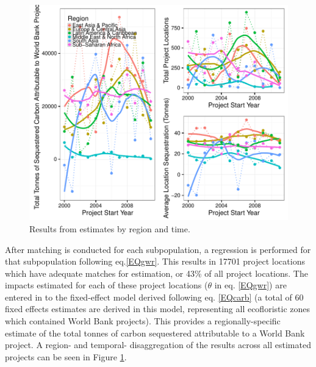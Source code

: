 \documentclass{article}\usepackage[]{graphicx}\usepackage[]{color}
\makeatletter
\def\maxwidth{ %
  \ifdim\Gin@nat@width>\linewidth
    \linewidth
  \else
    \Gin@nat@width
  \fi
}
\newenvironment{knitrout}{}{}  %
\makeatother
\begin{document}
\begin{knitrout}
\begin{figure}\centering
\begin{Schunk}

\includegraphics[width=\maxwidth]{figure/Fig1-1} \end{Schunk}
\caption{Results from estimates by region and time.}
\label{result_fig}
\vspace{10pt}
\end{figure}  

After matching is conducted for each subpopulation, a regression is performed for that subpopulation following eq.\ref{EQgwr}.  
This results in 17701 project locations which have adequate matches for estimation, or 43\% of all project locations. 
The impacts estimated for each of these project locations (\begin{math}\theta\end{math} in eq. \ref{EQgwr}) are entered in to the fixed-effect model derived following eq. \ref{EQcarb} (a total of 60 fixed effects estimates are derived in this model, representing all ecofloristic zones which contained World Bank projects).
This provides a regionally-specific estimate of the total tonnes of carbon sequestered attributable to a World Bank project.
A region- and temporal- disaggregation of the results across all estimated projects can be seen in Figure \ref{result_fig}.

\newpage

\end{knitrout}
\end{document}
